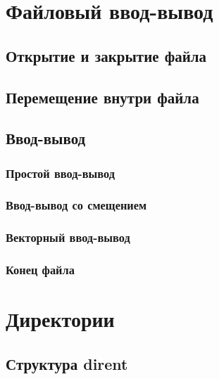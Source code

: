 \documentclass[oneside]{book}
\begin{document}
   \chapter{Файловый ввод-вывод}

      \section{Открытие и закрытие файла}
      

      \section{Перемещение внутри файла}
      

      \section{Ввод-вывод}

         \subsection{Простой ввод-вывод}
         

         \subsection{Ввод-вывод со смещением}
         

         \subsection{Векторный ввод-вывод}
         

      \subsection{Конец файла}
      

   \chapter{Директории}
   	

      \section{Структура dirent}
      
\end{document}
